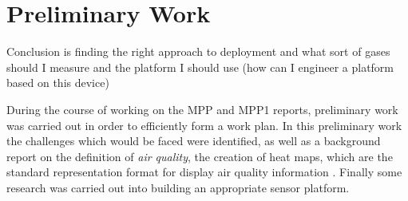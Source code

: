 \section{Preliminary Work}\label{preliminary}


Conclusion is finding the right approach to deployment and what sort of gases should I measure and the platform I should use (how can I engineer a platform based on this device)

During the course of working on the MPP and MPP1 reports, preliminary work was carried out in order to efficiently form a work plan. In this preliminary work the challenges which would be faced were identified, as well as a background report on the definition of \emph{air quality}, the creation of heat maps, which are the standard representation format for display air quality information . Finally some research was carried out into building an appropriate sensor platform.










